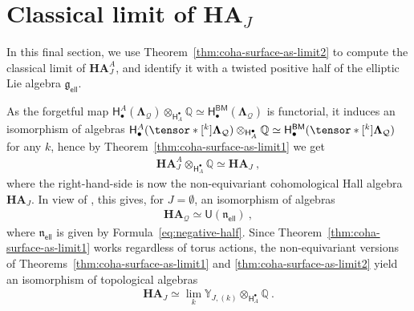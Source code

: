 \documentclass[reqno,a4paper]{amsart}
\newcommand{\Q}{\mathbb{Q}}
\newcommand{\Y}{\mathbb{Y}}
\newcommand{\sfU}{\mathsf{U}}
\newcommand{\kdLambdaqv}{\tensor*[^k]{\mathbf{\Lambda}}{_\qv}}
\newcommand{\dLambda}{\mathbf{\Lambda}}
\newcommand{\qv}{\mathcal{Q}}
\newcommand{\frakgell}{\mathfrak{g}_{\mathsf{ell}}}
\newcommand{\fraknell}{\mathfrak{n}_{\mathsf{ell}}}
\newcommand{\Hbullet}{\mathsf{H}^\bullet}
\newcommand{\HBMbullet}{\mathsf{H}_\bullet^{\mathsf{BM}}}
\newcommand{\HBMbulletA}{\mathsf{H}_\bullet^A}
\newcommand{\coha}{\mathbf{HA}}
\newcommand{\cohaqv}{\coha_\qv}
\theoremstyle{basic-theorem}
\numberwithin{equation}{section}
\begin{document}
\section{Classical limit of $\coha_J$}\label{sec:classical-limit}

In this final section, we use Theorem~\ref{thm:coha-surface-as-limit2} to compute the classical limit of $\coha^A_J$, and identify it with a twisted positive half of the elliptic Lie algebra $\frakgell$.

As the forgetful map $\HBMbulletA(\dLambda_\qv) \otimes_{\Hbullet_A} \Q \simeq \HBMbullet(\dLambda_\qv)$ is functorial, it induces an isomorphism of algebras $\HBMbulletA(\kdLambdaqv) \otimes_{\Hbullet_A} \Q \simeq \HBMbullet(\kdLambdaqv)$ for any $k$, hence by Theorem~\ref{thm:coha-surface-as-limit1} we get
\begin{align}
	\coha_J^A\otimes_{\Hbullet_A} \Q \simeq \coha_J\ ,
\end{align}
where the right-hand-side is now the non-equivariant cohomological Hall algebra $\coha_J$. In view of \cite[Propositions~\ref*{COHA-Yangian-prop:classical-limit} and \ref*{COHA-Yangian-prop:iso-s-uce-1}]{DPSSV-3}, this gives, for $J=\emptyset$, an isomorphism of algebras
\begin{align}\label{eq:cohaquiver-classical-limit}
	\cohaqv \simeq \sfU(\fraknell)\ ,
\end{align}
where $\fraknell$ is given by Formula~\eqref{eq:negative-half}. Since Theorem~\ref{thm:coha-surface-as-limit1} works regardless of torus actions, the non-equivariant versions of Theorems~\ref{thm:coha-surface-as-limit1} and \ref{thm:coha-surface-as-limit2} yield an isomorphism of topological algebras
\begin{align}\label{eq:cohasurface-classical-limit}
	\coha_J \simeq \lim_k \Y_{J, (k)}\otimes_{\Hbullet_A} \Q\ .
\end{align}
\end{document}
